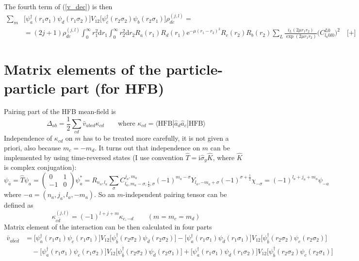 \documentclass[10pt,a4paper]{article}
\begin{document}
The fourth term of (\ref{v_dec}) is then
\begin{align}
\sum_m &\big[\psi_a^\dagger(r_1\sigma_1)\psi_d(r_1\sigma_2)\big]V_{12}
\big[\psi_c^\dagger(r_2\sigma_2)\psi_b(r_2\sigma_1)\big]\rho_{dc}^{(j,l)} =\nonumber\\
&= (2j+1)\rho_{dc}^{(j,l)} \int_0^\infty r_1^2\mathrm{d}r_1
\int_0^\infty r_2^2\mathrm{d}r_2 R_a(r_1) R_d(r_1)
\mathrm{e}^{-\mu(r_1-r_2)^2} R_c(r_2) R_b(r_2)
\sum_L \frac{i_L(2\mu r_1 r_2)}{\exp(2\mu r_1 r_2)}
\Big(C_{l_a 0 l 0}^{L0}\Big)^2 \quad \textbf{[+]}
\end{align}

\section{Matrix elements of the particle-particle part (for HFB)}
Pairing part of the HFB mean-field is
\begin{equation}
\Delta_{ab} = \frac{1}{2}\sum_{cd} \bar{v}_{abcd}\kappa_{cd} \qquad\textrm{where }
\kappa_{cd}=\langle\mathrm{HFB}|\hat{a}_d\hat{a}_c|\mathrm{HFB}\rangle
\end{equation}
Independence of $\kappa_{cd}$ on $m$ has to be treated more carefully, it is not given a priori, also because $m_c = -m_d$. It turns out that independence on $m$ can be implemented by using time-reversed states (I use convention $\hat{T} = \mathrm{i}\hat{\sigma}_y\hat{K}$, where $\hat{K}$ is complex conjugation):
\begin{equation}
\psi_{\bar{a}} = \hat{T}\psi_a = \begin{pmatrix} 0 & 1 \\ -1 & 0 \end{pmatrix}
\psi_a^* = R_{n_a,l_a}\sum_\sigma C_{l_a,m_a-\sigma,\frac{1}{2},\sigma}^{j_a,m_a}
(-1)^{m_a-\sigma} Y_{l_a,-m_a+\sigma} (-1)^{\sigma+\frac{1}{2}} \chi_{-\sigma}
= (-1)^{l_a+j_a+m_a}\psi_{-a}
\end{equation}
where $-a=(n_a,j_a,l_a,-m_a)$. So an $m$-independent pairing tensor can be defined as
\begin{equation}
\kappa_{c\bar{d}}^{(j,l)} = (-1)^{l+j+m}\kappa_{c,-d} \qquad(m=m_c=m_d)
\end{equation}
Matrix element of the interaction can be then calculated in four parts
\begin{subequations}\label{vpair_dec}
\begin{align}
\label{vpair_dec1}
\bar{v}_{a\bar{b}c\bar{d}} &= \big[\psi_a^\dagger(r_1\sigma_1)\psi_c(r_1\sigma_1)\big]V_{12}
\big[\psi_{\bar{b}}^\dagger(r_2\sigma_2)\psi_{\bar{d}}(r_2\sigma_2)\big]
- \big[\psi_a^\dagger(r_1\sigma_1)\psi_{\bar{d}}(r_1\sigma_1)\big]V_{12}
\big[\psi_{\bar{b}}^\dagger(r_2\sigma_2)\psi_c(r_2\sigma_2)\big] \\
\label{vpair_dec2}
&\quad -\big[\psi_a^\dagger(r_1\sigma_1)\psi_c(r_1\sigma_2)\big]V_{12}
\big[\psi_{\bar{b}}^\dagger(r_2\sigma_2)\psi_{\bar{d}}(r_2\sigma_1)\big]
+ \big[\psi_a^\dagger(r_1\sigma_1)\psi_{\bar{d}}(r_1\sigma_2)\big]V_{12}
\big[\psi_{\bar{b}}^\dagger(r_2\sigma_2)\psi_c(r_2\sigma_1)\big]
\end{align}
\end{subequations}
\end{document}
